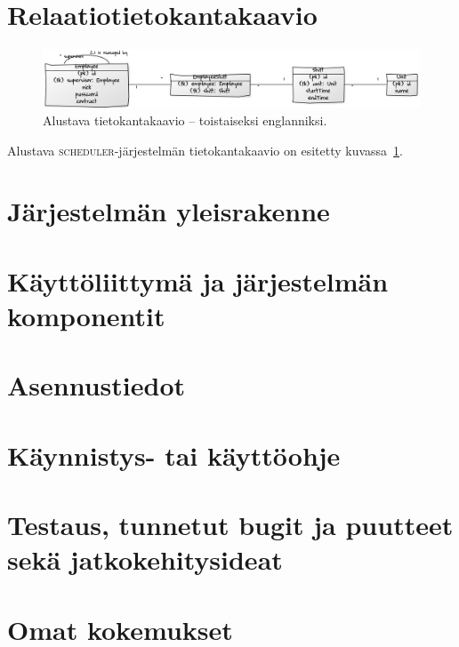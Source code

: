 \documentclass[10pt,titlepage,hidelinks]{scrartcl}
\newcommand{\scheduler}{\textsc{scheduler}}
\begin{document}
\section{Relaatiotietokantakaavio}

\begin{figure}[t]
\centering
\includegraphics[width=\textwidth]{af410d18}
\caption{Alustava tietokantakaavio -- toistaiseksi englanniksi.}
\label{fig:tietokantakaavio}
\end{figure}

Alustava \scheduler{}-järjestelmän tietokantakaavio on esitetty kuvassa~\ref{fig:tietokantakaavio}.

\section{Järjestelmän yleisrakenne}
\section{Käyttöliittymä ja järjestelmän komponentit}
\section{Asennustiedot}
\section{Käynnistys- tai käyttöohje}
\section{Testaus, tunnetut bugit ja puutteet sekä jatkokehitysideat}
\section{Omat kokemukset}
\end{document}
